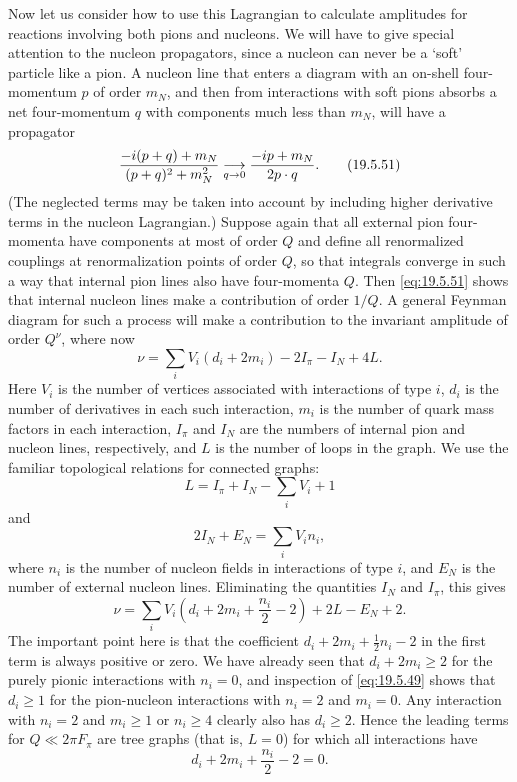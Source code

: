 Now let us consider how to use this Lagrangian to calculate amplitudes for reactions involving both pions and nucleons. We will have to give special attention to the nucleon propagators, since a nucleon can never be a `soft' particle like a pion. A nucleon line that enters a diagram with an on-shell four-momentum $p$ of order $m_N$, and then from interactions with soft pions absorbs a net four-momentum $q$ with components much less than $m_N$, will have a propagator
\begin{equation}
\frac{-i(\sl{p}+\sl{q})+m_N}{(p+q)^2+m_N^2}
\underset{q\to0}{\longrightarrow}
\frac{-i\sl{p}+m_N}{2p\cdot q}.
\tag{19.5.51}\label{eq:19.5.51}
\end{equation}
(The neglected terms may be taken into account by including higher derivative terms in the nucleon Lagrangian.) Suppose again that all external pion four-momenta have components at most of order $Q$ and define all renormalized couplings at renormalization points of order $Q$, so that integrals converge in such a way that internal pion lines also have four-momenta $Q$. Then \eqref{eq:19.5.51} shows that internal nucleon lines make a contribution of order $1/Q$. A general Feynman diagram for such a process will make a contribution to the invariant amplitude of order $Q^\nu$, where now
\begin{equation}
\nu=\sum_iV_i(d_i+2m_i)-2I_\pi-I_N+4L.
\tag{19.5.52}\label{eq:19.5.52}
\end{equation}
Here $V_i$ is the number of vertices associated with interactions of type $i$, $d_i$ is the number of derivatives in each such interaction, $m_i$ is the number of quark mass factors in each interaction, $I_\pi$ and $I_N$ are the numbers of internal pion and nucleon lines, respectively, and $L$ is the number of loops in the graph. We use the familiar topological relations for connected graphs:
\begin{equation}
L=I_\pi+I_N-\sum_iV_i+1
\tag{19.5.53}\label{eq:19.5.53}
\end{equation}
and
\begin{equation}
2I_N+E_N=\sum_iV_i n_i,
\tag{19.5.54}\label{eq:19.5.54}
\end{equation}
where $n_i$ is the number of nucleon fields in interactions of type $i$, and $E_N$ is the number of external nucleon lines. Eliminating the quantities $I_N$ and $I_\pi$, this gives
\begin{equation}
\nu=\sum_iV_i\left(d_i+2m_i+\frac{n_i}{2}-2\right)
+2L-E_N+2.
\tag{19.5.55}\label{eq:19.5.55}
\end{equation}
The important point here is that the coefficient $d_i+2m_i+\tfrac12n_i-2$ in the first term is always positive or zero. We have already seen that $d_i+2m_i\geq2$ for the purely pionic interactions with $n_i=0$, and inspection of \eqref{eq:19.5.49} shows that $d_i\geq1$ for the pion-nucleon interactions with $n_i=2$ and $m_i=0$. Any interaction with $n_i=2$ and $m_i\geq1$ or $n_i\geq4$ clearly also has $d_i\geq2$. Hence the leading terms for $Q\ll2\pi F_\pi$ are tree graphs (that is, $L=0$) for which all interactions have
\[
d_i+2m_i+\frac{n_i}{2}-2=0.
\]

